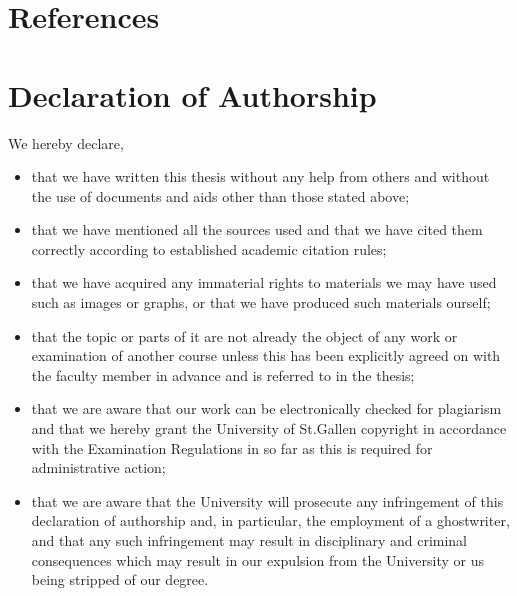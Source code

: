 \documentclass[a4paper,12pt]{article}
\begin{document}
\section{References}
\printbibliography[heading=none]
\clearpage

\section{Declaration of Authorship}
We hereby declare,

\begin{itemize}
	\item that we have written this thesis without any help from others and without the use of documents and aids other than those stated above;
	\item that we have mentioned all the sources used and that we have cited them correctly according to established academic citation rules;
    \item that we have acquired any immaterial rights to materials we may have used such as images or graphs, or that we have produced such materials ourself;
    \item that the topic or parts of it are not already the object of any work or examination of another course unless this has been explicitly agreed on with the faculty member in advance and is referred to in the thesis;
    \item that we are aware that our work can be electronically checked for plagiarism and that we hereby grant the University of St.Gallen copyright in accordance with the Examination Regulations in so far as this is required for administrative action;
    \item that we are aware that the University will prosecute any infringement of this declaration of authorship and, in particular, the employment of a ghostwriter, and that any such infringement may result in disciplinary and criminal consequences which may result in our expulsion from the University or us being stripped of our degree.
\end{itemize}
\end{document}
